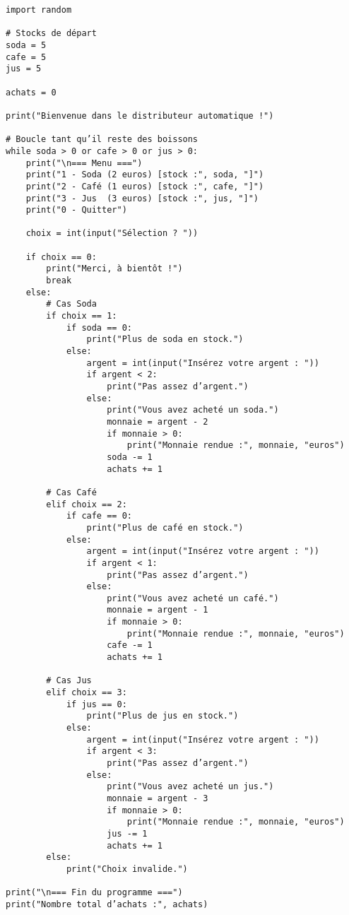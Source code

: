 \begin{verbatim}
import random

# Stocks de départ
soda = 5
cafe = 5
jus = 5

achats = 0

print("Bienvenue dans le distributeur automatique !")

# Boucle tant qu’il reste des boissons
while soda > 0 or cafe > 0 or jus > 0:
    print("\n=== Menu ===")
    print("1 - Soda (2 euros) [stock :", soda, "]")
    print("2 - Café (1 euros) [stock :", cafe, "]")
    print("3 - Jus  (3 euros) [stock :", jus, "]")
    print("0 - Quitter")

    choix = int(input("Sélection ? "))

    if choix == 0:
        print("Merci, à bientôt !")
        break
    else:
        # Cas Soda
        if choix == 1:
            if soda == 0:
                print("Plus de soda en stock.")
            else:
                argent = int(input("Insérez votre argent : "))
                if argent < 2:
                    print("Pas assez d’argent.")
                else:
                    print("Vous avez acheté un soda.")
                    monnaie = argent - 2
                    if monnaie > 0:
                        print("Monnaie rendue :", monnaie, "euros")
                    soda -= 1
                    achats += 1

        # Cas Café
        elif choix == 2:
            if cafe == 0:
                print("Plus de café en stock.")
            else:
                argent = int(input("Insérez votre argent : "))
                if argent < 1:
                    print("Pas assez d’argent.")
                else:
                    print("Vous avez acheté un café.")
                    monnaie = argent - 1
                    if monnaie > 0:
                        print("Monnaie rendue :", monnaie, "euros")
                    cafe -= 1
                    achats += 1

        # Cas Jus
        elif choix == 3:
            if jus == 0:
                print("Plus de jus en stock.")
            else:
                argent = int(input("Insérez votre argent : "))
                if argent < 3:
                    print("Pas assez d’argent.")
                else:
                    print("Vous avez acheté un jus.")
                    monnaie = argent - 3
                    if monnaie > 0:
                        print("Monnaie rendue :", monnaie, "euros")
                    jus -= 1
                    achats += 1
        else:
            print("Choix invalide.")

print("\n=== Fin du programme ===")
print("Nombre total d’achats :", achats)
\end{verbatim}

